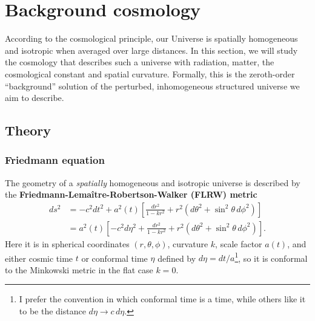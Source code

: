 \documentclass[10pt,a4paper]{article}
\begin{document}
\clearpage

\section{Background cosmology}
\label{sec_background_cosmology}

According to the cosmological principle,
our Universe is spatially homogeneous and isotropic when averaged over large distances.
In this section, we will study the cosmology that describes such a universe
with radiation, matter, the cosmological constant and spatial curvature.
Formally, this is the zeroth-order ``background'' solution of the perturbed, inhomogeneous structured universe we aim to describe.

\subsection{Theory}
\label{sec_background_cosmology_theory}

\subsubsection{Friedmann equation}

The geometry of a \emph{spatially} homogeneous and isotropic universe
is described by the \textbf{Friedmann-Lemaître-Robertson-Walker (FLRW) metric}
\begin{equation}
\begin{split}
	ds^2 &= -c^2 dt^2 + a^2(t) \left[\frac{dr^2}{1 - kr^2} + r^2\left(d\theta^2 + \sin^2\theta \, d\phi^2\right) \right] \\
	     &= a^2(t) \left[-c^2 d\eta^2 + \frac{dr^2}{1 - kr^2} + r^2\left(d\theta^2 + \sin^2\theta \, d\phi^2\right) \right].
\end{split}
\label{eq_flrw}
\end{equation}
Here it is in spherical coordinates $(r,\theta,\phi)$, curvature $k$, scale factor $a(t)$,
and either cosmic time $t$ or conformal time $\eta$ defined by $d\eta = dt/a$\footnote{I prefer the convention in which conformal time is a time, while others like it to be the distance $d\eta \rightarrow c \, d\eta$.},
so it is conformal to the Minkowski metric in the flat case $k=0$.
\end{document}
